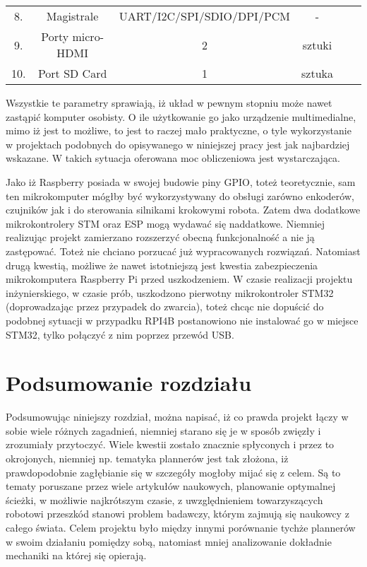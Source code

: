 \begin{table}[H]
\begin{tabular}{|c|c|c|c|ll}
\cellcolor[HTML]{C0C0C0}8.   & \cellcolor[HTML]{C0C0C0}Magistrale        & \cellcolor[HTML]{C0C0C0}UART/I2C/SPI/SDIO/DPI/PCM       & \cellcolor[HTML]{C0C0C0}-         &  &  \\ \cline{1-4}
\cellcolor[HTML]{EFEFEF}9.   & \cellcolor[HTML]{EFEFEF}Porty micro-HDMI  & \cellcolor[HTML]{EFEFEF}2                               & \cellcolor[HTML]{EFEFEF}sztuki    &  &  \\ \cline{1-4}
\cellcolor[HTML]{C0C0C0}10.  & \cellcolor[HTML]{C0C0C0}Port SD Card      & \cellcolor[HTML]{C0C0C0}1                               & \cellcolor[HTML]{C0C0C0}sztuka    &  &  \\ \cline{1-4}
\end{tabular}
\end{table}

 Wszystkie te parametry sprawiają, iż układ w pewnym stopniu może nawet zastąpić komputer osobisty. O ile użytkowanie go jako urządzenie multimedialne, mimo iż jest to możliwe, to jest to raczej mało praktyczne, o tyle wykorzystanie w projektach podobnych do opisywanego w niniejszej pracy jest jak najbardziej wskazane. W takich sytuacja oferowana moc obliczeniowa jest wystarczająca.

Jako iż Raspberry posiada w swojej budowie piny GPIO, toteż teoretycznie, sam ten mikrokomputer mógłby być wykorzystywany do obsługi zarówno enkoderów, czujników jak i do sterowania silnikami krokowymi robota. Zatem dwa dodatkowe mikrokontrolery STM oraz ESP mogą wydawać się naddatkowe. Niemniej realizując projekt zamierzano rozszerzyć obecną funkcjonalność a nie ją zastępować. Toteż nie chciano porzucać już wypracowanych rozwiązań. Natomiast drugą kwestią, możliwe że nawet istotniejszą jest kwestia zabezpieczenia mikrokomputera Raspberry Pi przed uszkodzeniem. W czasie realizacji projektu inżynierskiego, w czasie prób, uszkodzono pierwotny mikrokontroler STM32 (doprowadzając przez przypadek do zwarcia), toteż chcąc nie dopuścić do podobnej sytuacji w przypadku RPI4B postanowiono nie instalować go w miejsce STM32, tylko połączyć z nim poprzez przewód USB.



\section{Podsumowanie rozdziału}

Podsumowując niniejszy rozdział, można napisać, iż co prawda projekt łączy w sobie wiele różnych zagadnień, niemniej starano się je w sposób zwięzły i zrozumiały przytoczyć. Wiele kwestii zostało znacznie spłyconych i przez to okrojonych, niemniej np. tematyka plannerów jest tak złożona, iż prawdopodobnie zagłębianie się w szczegóły mogłoby mijać się z celem. Są to tematy poruszane przez wiele artykułów naukowych, planowanie optymalnej ścieżki, w możliwie najkrótszym czasie, z uwzględnieniem towarzyszących robotowi przeszkód stanowi problem badawczy, którym zajmują się naukowcy z całego świata. Celem projektu było między innymi porównanie tychże plannerów w swoim działaniu pomiędzy sobą, natomiast mniej analizowanie dokładnie mechaniki na której się opierają.


